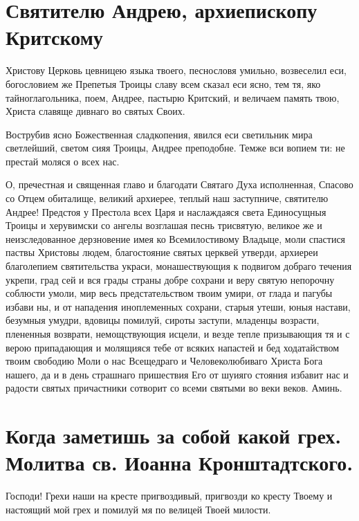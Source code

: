 \section{Святителю  Андрею, архиепископу Критскому}\begin{mymulticols}


Христову Церковь цевницею языка твоего, песнословя умильно, возвеселил еси, богословием же Препетыя Троицы славу всем сказал еси ясно, тем тя, яко тайноглагольника, поем, Андрее, пастырю Критский, и величаем память твою, Христа славяще дивнаго во святых Своих.


Вострубив ясно Божественная сладкопения, явился еси светильник мира светлейший, светом сияя Троицы, Андрее преподобне. Темже вси вопием ти: не престай моляся о всех нас.


О, пречестная и священная главо и благодати Святаго Духа исполненная, Спасово со Отцем обиталище, великий архиерее, теплый наш заступниче, святителю Андрее! Предстоя у Престола всех Царя и наслаждаяся света Единосущныя Троицы и херувимски со ангелы возглашая песнь трисвятую, великое же и неизследованное дерзновение имея ко Всемилостивому Владыце, моли спастися паствы Христовы людем, благостояние святых церквей утверди, архиереи благолепием святительства украси, монашествующия к подвигом добраго течения укрепи, град сей и вся грады страны добре сохрани и веру святую непорочну соблюсти умоли, мир весь предстательством твоим умири, от глада и пагубы избави ны, и от нападения иноплеменных сохрани, старыя утеши, юныя настави, безумныя умудри, вдовицы помилуй, сироты заступи, младенцы возрасти, плененныя возврати, немощствующия исцели, и везде тепле призывающия тя и с верою припадающия и молящияся тебе от всяких напастей и бед ходатайством твоим свободию Моли о нас Всещедраго и Человеколюбиваго Христа Бога нашего, да и в день страшнаго пришествия Его от шуияго стояния избавит нас и радости святых причастники сотворит со всеми святыми во веки веков. Аминь.

\end{mymulticols}

\section{Когда заметишь за собой какой грех. Молитва св. Иоанна Кронштадтского.}\begin{mymulticols}

Господи! Грехи наши на кресте пригвоздивый, пригвозди ко кресту Твоему и настоящий мой грех и помилуй мя по велицей Твоей милости. 

\end{mymulticols}

